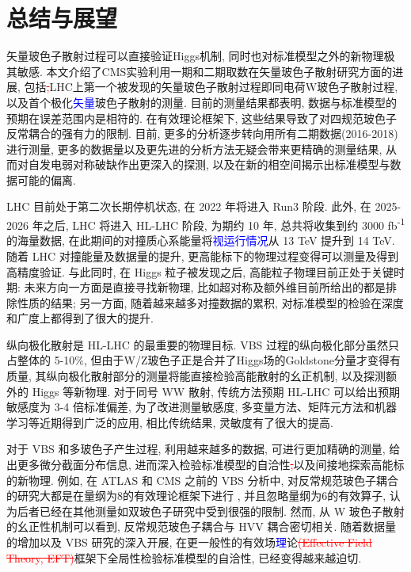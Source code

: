 \documentclass{SCIS2020cn}
\newcommand{\add}{\textcolor{blue}}
\newcommand{\rmv}[1]{\textcolor{red}{\sout{#1}}}
\begin{document}
\section{总结与展望}

矢量玻色子散射过程可以直接验证Higgs机制, 同时也对标准模型之外的新物理极其敏感. 本文介绍了CMS实验利用一期和二期取数在矢量玻色子散射研究方面的进展, 包括\rmv{,}LHC上第一个被发现的矢量玻色子散射过程即同电荷W玻色子散射过程, 以及首个极化\add{矢量}玻色子散射的测量. 目前的测量结果都表明, 数据与标准模型的预期在误差范围内是相符的. 在有效理论框架下, 这些结果导致了对四规范玻色子反常耦合的强有力的限制. 目前, 更多的分析逐步转向用所有二期数据(2016-2018)进行测量, 更多的数据量以及更先进的分析方法无疑会带来更精确的测量结果, 从而对自发电弱对称破缺作出更深入的探测, 以及在新的相空间揭示出标准模型与数据可能的偏离. 

LHC 目前处于第二次长期停机状态, 在 2022 年将进入 Run3 阶段. 此外, 在 2025-2026 年之后, LHC 将进入 HL-LHC 阶段, 为期约 10 年, 总共将收集到约 3000 fb\textsuperscript{-1} 的海量数据, 在此期间的对撞质心系能量将\add{视运行情况}从 13 TeV 提升到 14 TeV. 随着 LHC 对撞能量及数据量的提升, 更高能标下的物理过程变得可以测量及得到高精度验证. 与此同时, 在 Higgs 粒子被发现之后, 高能粒子物理目前正处于关键时期: 未来方向一方面是直接寻找新物理, 比如超对称及额外维目前所给出的都是排除性质的结果; 另一方面, 随着越来越多对撞数据的累积, 对标准模型的检验在深度和广度上都得到了很大的提升.

纵向极化散射是 HL-LHC 的最重要的物理目标. VBS 过程的纵向极化部分虽然只占整体的 5-10\%, 但由于W/Z玻色子正是合并了Higgs场的Goldstone分量才变得有质量, 其纵向极化散射部分的测量将能直接检验高能散射的幺正机制, 以及探测额外的 Higgs 等新物理. 对于同号 WW 散射, 传统方法预期 HL-LHC 可以给出预期敏感度为 3-4 倍标准偏差, 为了改进测量敏感度, 多变量方法、矩阵元方法和机器学习等近期得到广泛的应用, 相比传统结果, 灵敏度有了很大的提高.

对于 VBS 和多玻色子产生过程, 利用越来越多的数据, 可进行更加精确的测量, 给出更多微分截面分布信息, 进而深入检验标准模型的自洽性\rmv{,}以及间接地探索高能标的新物理. 例如, 在 ATLAS 和 CMS 之前的 VBS 分析中, 对反常规范玻色子耦合的研究大都是在量纲为8的有效理论框架下进行 , 并且忽略量纲为6的有效算子, 认为后者已经在其他测量如双玻色子研究中受到很强的限制. 然而, 从 W 玻色子散射的幺正性机制可以看到, 反常规范玻色子耦合与 HVV 耦合密切相关. 随着数据量的增加以及 VBS 研究的深入开展, 在更一般性的有效场\add{理}论\rmv{(Effective Field Theory, EFT)}框架下全局性检验标准模型的自洽性, 已经变得越来越迫切.
\end{document}
